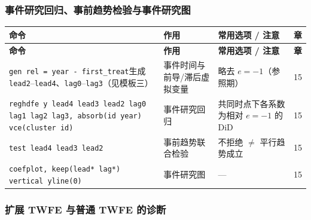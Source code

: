 \subsubsection{事件研究回归、事前趋势检验与事件研究图}

{\renewcommand{\arraystretch}{1.12}\begin{longtable}{@{}>{\raggedright\arraybackslash\small}p{5.3cm}>{\raggedright\arraybackslash\small}p{3.8cm}>{\raggedright\arraybackslash\small}p{5.3cm}>{\centering\arraybackslash\small}p{0.9cm}@{}}
\toprule
\textbf{命令} & \textbf{作用} & \textbf{常用选项 / 注意} & \textbf{章}\\
\midrule
\endfirsthead
\toprule
\textbf{命令} & \textbf{作用} & \textbf{常用选项 / 注意} & \textbf{章}\\
\midrule
\endhead
\bottomrule
\endlastfoot

\texttt{gen rel = year - first\_treat}\newline 生成 \texttt{lead2}–\texttt{lead4}、\texttt{lag0}–\texttt{lag3}（见模板三） & 事件时间与前导/滞后虚拟变量 & 略去 $e=-1$（参照期） & 15\\
\addlinespace[1pt]
\texttt{reghdfe y lead4 lead3 lead2 lag0 lag1 lag2 lag3, absorb(id year) vce(cluster id)} & 事件研究回归 & 共同时点下各系数为相对 $e=-1$ 的 DiD & 15\\
\addlinespace[1pt]
\texttt{test lead4 lead3 lead2} & 事前趋势联合检验 & 不拒绝 $\neq$ 平行趋势成立 & 15\\
\addlinespace[1pt]
\texttt{coefplot, keep(lead* lag*) vertical yline(0)}\newline {\footnotesize\rmfamily [SSC]} & 事件研究图 & — & 15\\
\end{longtable}}


\subsubsection{扩展 TWFE 与普通 TWFE 的诊断}

